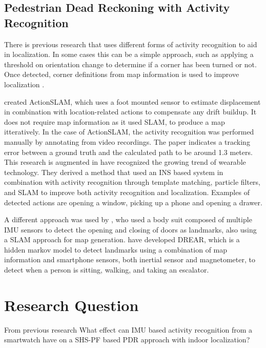 \subsection{Pedestrian Dead Reckoning with Activity Recognition}

There is previous research that uses different forms of activity recognition to aid in localization. In some cases this can be a simple approach, such as applying a threshold on orientation change to determine if a corner has been turned or not. Once detected, corner definitions from map information is used to improve localization \cite{Gu2019,Jackermeier2018}. \par 
\citet{Hardegger2012} created ActionSLAM, which uses a foot mounted sensor to estimate displacement in combination with location-related actions to compensate any drift buildup. It does not require map information as it used \ac{SLAM}, to produce a map itteratively. In the case of ActionSLAM, the activity recognition was performed manually by annotating from video recordings. The paper indicates a tracking error between a ground truth and the calculated path to be around 1.3 meters. This research is augmented in \citet{Hardegger2016} have recognized the growing trend of wearable technology. They derived a method that used an INS based system in combination with activity recognition through template matching, particle filters, and SLAM to improve both activity recognition and localization. Examples of detected actions are opening a window, picking up a phone and opening a drawer. \par
A different approach was used by \citet{Grzonka2010}, who used a body suit composed of multiple IMU sensors to detect the opening and closing of doors as landmarks, also using a \ac{SLAM} approach for map generation. \citet{Torok2014} have developed DREAR, which is a hidden markov model to detect landmarks using a combination of map information and smartphone sensors, both inertial sensor and magnetometer, to detect when a person is sitting, walking, and taking an escalator.

\section{Research Question}

From previous research 
What effect can \ac{IMU} based activity recognition from a smartwatch have on a \ac{SHS}-\ac{PF} based \ac{PDR} approach with indoor localization?





